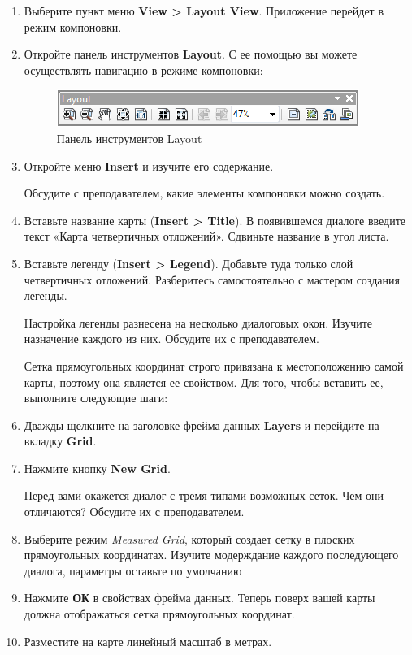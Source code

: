 \documentclass[]{book}
\theoremstyle{definition}
\theoremstyle{definition}
\theoremstyle{definition}
\theoremstyle{remark}
\begin{document}
\begin{enumerate}
\def\labelenumi{\arabic{enumi}.}
\item
  Выберите пункт меню \textbf{View \textgreater{} Layout View}.
  Приложение перейдет в режим компоновки.
\item
  Откройте панель инструментов \textbf{Layout}. С ее помощью вы можете
  осуществлять навигацию в режиме компоновки:

  \begin{figure}
  \centering
  \includegraphics{images/Ex03/image20.png}
  \caption{Панель инструментов Layout}
  \end{figure}
\item
  Откройте меню \textbf{Insert} и изучите его содержание.

  Обсудите с преподавателем, какие элементы компоновки можно создать.
\item
  Вставьте название карты (\textbf{Insert \textgreater{} Title}). В
  появившемся диалоге введите текст «Карта четвертичных отложений».
  Сдвиньте название в угол листа.
\item
  Вставьте легенду (\textbf{Insert \textgreater{} Legend}). Добавьте
  туда только слой четвертичных отложений. Разберитесь самостоятельно с
  мастером создания легенды.

  Настройка легенды разнесена на несколько диалоговых окон. Изучите
  назначение каждого из них. Обсудите их с преподавателем.

  Сетка прямоугольных координат строго привязана к местоположению самой
  карты, поэтому она является ее свойством. Для того, чтобы вставить ее,
  выполните следующие шаги:
\item
  Дважды щелкните на заголовке фрейма данных \textbf{Layers} и перейдите
  на вкладку \textbf{Grid}.
\item
  Нажмите кнопку \textbf{New Grid}.

  Перед вами окажется диалог с тремя типами возможных сеток. Чем они
  отличаются? Обсудите их с преподавателем.
\item
  Выберите режим \emph{Measured Grid}, который создает сетку в плоских
  прямоугольных координатах. Изучите модерждание каждого последующего
  диалога, параметры оставьте по умолчанию
\item
  Нажмите \textbf{ОК} в свойствах фрейма данных. Теперь поверх вашей
  карты должна отображаться сетка прямоугольных координат.
\item
  Разместите на карте линейный масштаб в метрах.
\end{enumerate}
\end{document}
